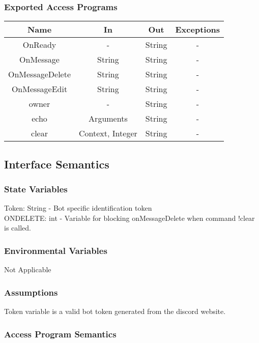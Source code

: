\documentclass[12,english]{article}
\begin{document}
		\subsubsection{Exported Access Programs}
		\begin{tabular}[pos]{|c|c|c|c|}
			
			\hline
			\textbf{Name}& \textbf{In} & \textbf{Out} & \textbf{Exceptions} \\ \hline
			OnReady & - & String & -\\ \hline
			OnMessage & String & String & -\\ \hline
			OnMessageDelete & String & String & -\\ \hline
			OnMessageEdit & String & String & -\\ \hline
			owner & - & String & -\\ \hline
			echo & Arguments & String & -\\ \hline
			clear & Context, Integer & String & -\\ 
			 \hline
			
		\end{tabular}
		
		\subsection{Interface Semantics}
		\subsubsection{State Variables}
			Token: String - Bot specific identification token\\
		ONDELETE: int - Variable for blocking onMessageDelete when command !clear is called.\\

		
		\subsubsection{Environmental Variables}
		Not Applicable
		
		\subsubsection{Assumptions}
		Token variable is a valid bot token generated from the discord website.
		
		\subsubsection{Access Program Semantics}
		
\end{document}

